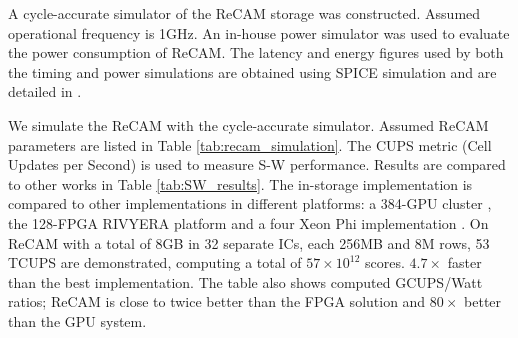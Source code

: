 \documentclass{superfri}
\begin{document}
	A cycle-accurate simulator of the ReCAM storage was constructed. Assumed operational frequency is 1GHz. An in-house power simulator was used to evaluate the power consumption of ReCAM. The latency and energy figures used by both the timing and power simulations are obtained using SPICE simulation and are detailed in \cite{yavits2015resistive}. 
	
	
	We simulate the ReCAM with the cycle-accurate simulator. Assumed ReCAM parameters are listed in Table \ref{tab:recam_simulation}. The CUPS metric (Cell Updates per Second) is used to measure S-W performance. Results are compared to other works in Table \ref{tab:SW_results}. The in-storage implementation is compared to other implementations in different platforms: a 384-GPU cluster \cite{de2016cudalign}, the 128-FPGA RIVYERA platform \cite{Wienbrandt2014} and a four Xeon Phi implementation \cite{liu2014swaphi}. On ReCAM with a total of 8GB in 32 separate ICs, each 256MB and 8M rows, 53 TCUPS are demonstrated, computing a total of  $57\times10^{12}$  scores. $4.7\times$ faster than the best implementation. The table also shows computed GCUPS/Watt ratios; ReCAM is close to twice better than the FPGA solution and $80\times$ better than the GPU system.
	
	
	
	
\end{document}
